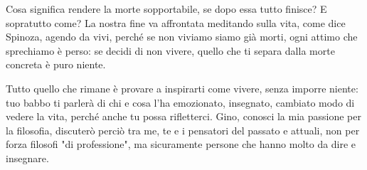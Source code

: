 Cosa significa rendere la morte sopportabile, se dopo essa tutto finisce? E sopratutto come? La nostra fine va affrontata meditando sulla vita, come dice Spinoza, agendo da vivi, perché se non viviamo siamo già morti, ogni attimo che sprechiamo è perso: se decidi di non vivere, quello che ti separa dalla morte concreta è puro niente. 

Tutto quello che rimane è provare a inspirarti come vivere, senza imporre niente: tuo babbo ti parlerà di chi e cosa l'ha emozionato, insegnato, cambiato modo di vedere la vita, perché anche tu possa rifletterci. Gino, conosci la mia passione per la filosofia, discuterò perciò tra me, te e i pensatori del passato e attuali, non per forza filosofi "di professione", ma sicuramente persone che hanno molto da dire e insegnare. 